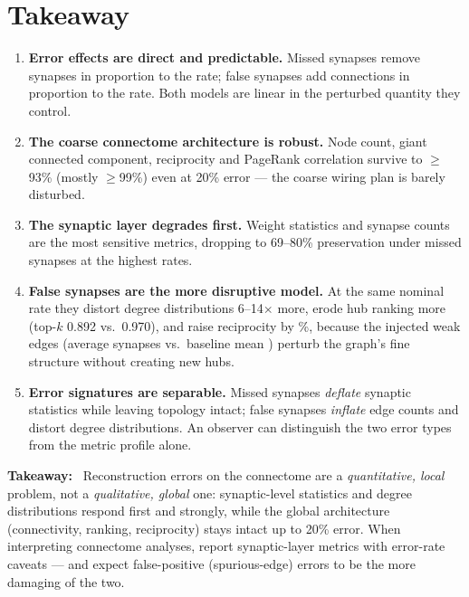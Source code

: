 \documentclass[11pt,a4paper]{article}
\newcommand{\takeaway}[1]{%
  \par\noindent\colorbox{boxlight}{%
    \parbox{\dimexpr\textwidth-2\fboxsep\relax}{%
      {\small\color{navy}\textbf{Takeaway:}~#1}}\hspace{0pt}}\par}
\begin{document}
\section{Takeaway}
\begin{enumerate}
  \item \textbf{Error effects are direct and predictable.}  Missed synapses
        remove synapses in proportion to the rate; false synapses add
        connections in proportion to the rate.  Both models are linear in the
        perturbed quantity they control.
  \item \textbf{The coarse connectome architecture is robust.}  Node count,
        giant connected component, reciprocity and PageRank correlation
        survive to $\ge$93\% (mostly $\ge$99\%) even at 20\% error --- the
        coarse wiring plan is barely disturbed.
  \item \textbf{The synaptic layer degrades first.}  Weight statistics and
        synapse counts are the most sensitive metrics, dropping to
        69--80\% preservation under missed synapses at the highest rates.
  \item \textbf{False synapses are the more disruptive model.}  At the same
        nominal rate they distort degree distributions 6--14$\times$ more,
        erode hub ranking more (top-$k$ 0.892 vs.\ 0.970), and raise
        reciprocity by \falseRecipTwenty\%, because the injected weak edges
        (average \addedWeight{} synapses vs.\ baseline mean
        \baselineWeightMean{}) perturb the graph's fine structure without
        creating new hubs.
  \item \textbf{Error signatures are separable.}  Missed synapses
        \emph{deflate} synaptic statistics while leaving topology intact;
        false synapses \emph{inflate} edge counts and distort degree
        distributions.  An observer can distinguish the two error types from
        the metric profile alone.
\end{enumerate}

\takeaway{
  Reconstruction errors on the connectome are a \emph{quantitative, local}
  problem, not a \emph{qualitative, global} one: synaptic-level statistics
  and degree distributions respond first and strongly, while the global
  architecture (connectivity, ranking, reciprocity) stays intact up to 20\%
  error.  When interpreting connectome analyses, report synaptic-layer
  metrics with error-rate caveats --- and expect false-positive
  (spurious-edge) errors to be the more damaging of the two.
}
\end{document}
